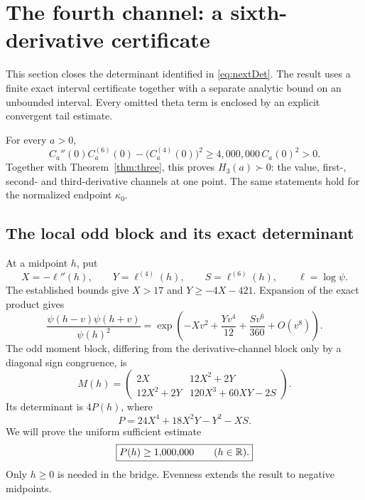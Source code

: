 \section{The fourth channel: a sixth-derivative certificate}
This section closes the determinant identified in \eqref{eq:nextDet}. The result uses a finite exact interval certificate together with a separate analytic bound on an unbounded interval. Every omitted theta term is enclosed by an explicit convergent tail estimate.

\begin{theorem}\label{thm:four}
For every $a>0$,
\begin{equation}\label{eq:sixthTarget}
\boxed{C_a''(0)C_a^{(6)}(0)-\bigl(C_a^{(4)}(0)\bigr)^2
\ge4{,}000{,}000\,C_a(0)^2>0.}
\end{equation}
Together with Theorem~\ref{thm:three}, this proves $H_3(a)\succ0$: the value, first-, second- and third-derivative channels at one point. The same statements hold for the normalized endpoint $\kappa_0$.
\end{theorem}

\subsection{The local odd block and its exact determinant}
At a midpoint $h$, put
\[
X=-\ell''(h),\qquad Y=\ell^{(4)}(h),\qquad S=\ell^{(6)}(h),
\qquad \ell=\log\psi.
\]
The established bounds give $X>17$ and $Y\ge-4X-421$. Expansion of the exact product gives
\[
\frac{\psi(h-v)\psi(h+v)}{\psi(h)^2}
=\exp\left(-Xv^2+\frac{Yv^4}{12}+\frac{Sv^6}{360}+O(v^8)\right).
\]
The odd moment block, differing from the derivative-channel block only by a diagonal sign congruence, is
\begin{equation}\label{eq:localOdd}
M(h)=\begin{pmatrix}
2X&12X^2+2Y\\
12X^2+2Y&120X^3+60XY-2S
\end{pmatrix}.
\end{equation}
Its determinant is $4P(h)$, where
\begin{equation}\label{eq:P6}
P=24X^4+18X^2Y-Y^2-XS.
\end{equation}
We will prove the uniform sufficient estimate
\begin{equation}\label{eq:pointSixth}
\boxed{P(h)\ge1{,}000{,}000\qquad(h\in\mathbb R).}
\end{equation}
Only $h\ge0$ is needed in the bridge. Evenness extends the result to negative midpoints.

